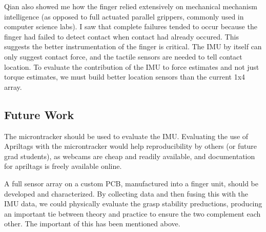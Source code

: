 \documentclass[preprint,12pt,3p]{elsarticle}
\begin{document}


Qian also showed me how the finger relied extensively on mechanical mechanism intelligence (as opposed to full
actuated parallel grippers, commonly used in computer science labs). I saw that complete failures
tended to occur because the finger had failed to detect contact when contact had already occured.
This suggests the better instrumentation of the finger is critical. The IMU by itself can only
suggest contact force, and the tactile sensors are needed to tell contact location. To evaluate the
contribution of the IMU to force estimates and not just torque estimates, we must build better
location sensors than the current 1x4 array.


%
%

\subsection{Future Work}

The microntracker should be used to evaluate the IMU. Evaluating the use of Apriltags with the
microntracker would help reproducibility by others (or future grad students), as webcams are cheap
and readily available, and documentation for apriltags is freely available online.

A full sensor array on a custom PCB, manufactured into a finger unit, should be
developed and characterized. By collecting data and then fusing this with the IMU data, we could
physically evaluate the grasp stability preductions, producing an important tie between theory and
practice to ensure the two complement each other. The important of this has been mentioned above.
\end{document}
